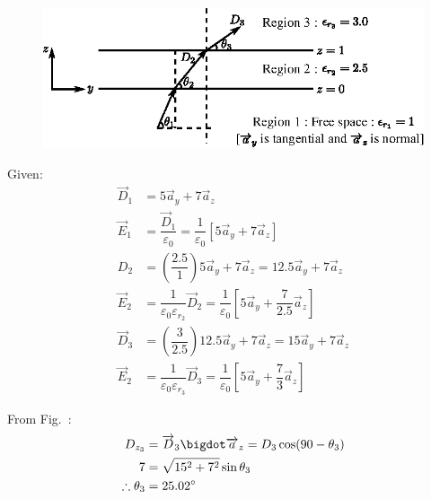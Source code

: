 \begin{solution}
~

\begin{figure}[H]
\centering
\includegraphics[scale=1.1]{images/fig6.eps}\label{chap27-fig6}
\end{figure}

Given:
\begin{align*}
\overrightarrow{D}_{1} & = 5\overrightarrow{a}_{y} + 7\overrightarrow{a}_{z}\\
\overrightarrow{E}_{1} & = \dfrac{\overrightarrow{D}_{1}}{\varepsilon_{0}} = \dfrac{1}{\varepsilon_{0}} [5\overrightarrow{a}_{y} + 7\overrightarrow{a}_{z}]\\
D_{2} & = \left(\dfrac{2.5}{1}\right) 5\overrightarrow{a}_{y} + 7\overrightarrow{a}_{z} = 12.5\overrightarrow{a}_{y} + 7\overrightarrow{a}_{z}\\
\overrightarrow{E}_{2} & = \dfrac{1}{\varepsilon_{0}\varepsilon_{r_{2}}} \overrightarrow{D}_{2} = \dfrac{1}{\varepsilon_{0}} \left[5\overrightarrow{a}_{y} + \dfrac{7}{2.5} \overrightarrow{a}_{z}\right]\\
\overrightarrow{D}_{3} & = \left(\dfrac{3}{2.5}\right) 12.5\overrightarrow{a}_{y} + 7\overrightarrow{a}_{z} = 15\overrightarrow{a}_{y} + 7\overrightarrow{a}_{z}\\
\overrightarrow{E}_{2} & = \dfrac{1}{\varepsilon_{0}\varepsilon_{r_{3}}} \overrightarrow{D}_{3} = \dfrac{1}{\varepsilon_{0}} \left[5\overrightarrow{a}_{y} + \dfrac{7}{3} \overrightarrow{a}_{z}\right]
\end{align*}

From Fig.~: 
\begin{align*}
D_{z_{3}} & = \overrightarrow{D}_{3} \bigdot \overrightarrow{a}_{z} = D_{3} \cos (90 - \theta_{3})\\
7 & = \sqrt{15^{2} + 7^{2}} \sin \theta_{3}\\
\therefore \theta_{3} & = 25.02^{\circ}
\end{align*}
\end{solution}

